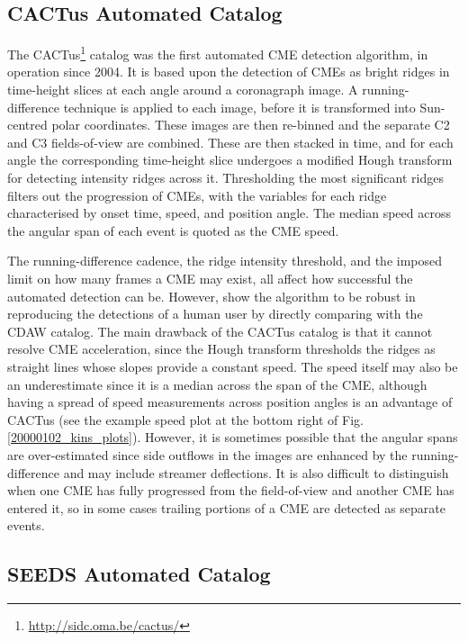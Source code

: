 \documentclass[referee,a4paper,12pt,traditabstract]{swsc}
\begin{document}
\subsection{CACTus Automated Catalog}

The CACTus\footnote{\href{http://sidc.oma.be/cactus/}{http://sidc.oma.be/cactus/}} catalog was the first automated CME detection algorithm, in operation since 2004. It is based upon the detection of CMEs as bright ridges in time-height slices at each angle around a coronagraph image. A running-difference technique is applied to each image, before it is transformed into Sun-centred polar coordinates. These images are then re-binned and the separate C2 and C3 fields-of-view are combined. These are then stacked in time, and for each angle the corresponding time-height slice undergoes a modified Hough transform for detecting intensity ridges across it. Thresholding the most significant ridges filters out the progression of CMEs, with the variables for each ridge characterised by onset time, speed, and position angle. The median speed across the angular span of each event is quoted as the CME speed.

The running-difference cadence, the ridge intensity threshold, and the imposed limit on how many frames a CME may exist, all affect how successful the automated detection can be. However, \citet{2004A&A...425.1097R} show the algorithm to be robust in reproducing the detections of a human user by directly comparing with the CDAW catalog. The main drawback of the CACTus catalog is that it cannot resolve CME acceleration, since the Hough transform thresholds the ridges as straight lines whose slopes provide a constant speed. The speed itself may also be an underestimate since it is a median across the span of the CME, although having a spread of speed measurements across position angles is an advantage of CACTus (see the example speed plot at the bottom right of Fig.\,\ref{20000102_kins_plots}). However, it is sometimes possible that the angular spans are over-estimated since side outflows in the images are enhanced by the running-difference and may include streamer deflections. It is also difficult to distinguish when one CME has fully progressed from the field-of-view and another CME has entered it, so in some cases trailing portions of a CME are detected as separate events.

\subsection{SEEDS Automated Catalog}
\end{document}
